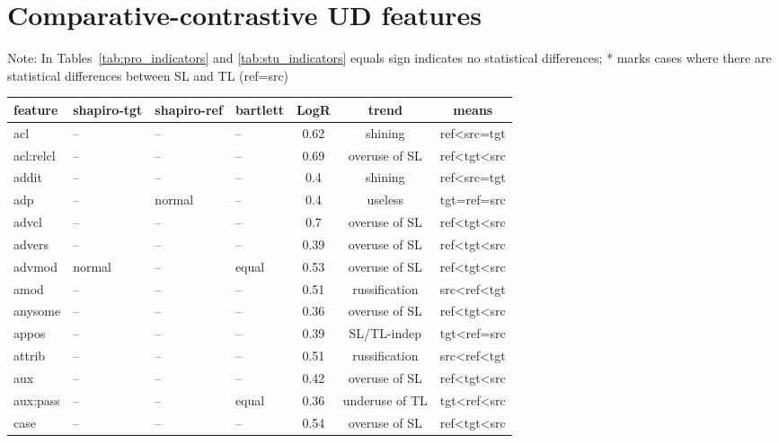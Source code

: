\chapter{\label{appx:feat_analysis}Comparative-contrastive UD features}

Note: In Tables~\ref{tab:pro_indicators} and \ref{tab:stu_indicators} equals sign indicates no statistical differences; * marks cases where there are statistical differences between SL and TL (ref=src)

\begin{longtable}{l|p{2cm}p{2cm}p{1.5cm}ccc}
	\toprule
	feature       & shapiro-tgt & shapiro-ref & bartlett & LogR & trend          & means \\
	\midrule
	acl           & -- & --   & --  & 0.62    & shining        & ref\textless{}src=tgt \\
	acl:relcl     & -- & --   & --  & 0.69    & overuse of SL & ref\textless{}tgt\textless{}src \\
	addit         & -- & --  & --   & 0.4     & shining   & ref\textless{}src=tgt \\
	adp           & -- & normal& --& 0.4  & useless   & tgt=ref=src   \\
	advcl         & -- & --   & --  & 0.7 & overuse of SL  & ref\textless{}tgt\textless{}src \\
	advers        & -- & --  & --   & 0.39 & overuse of SL  & ref\textless{}tgt\textless{}src \\
	advmod        & normal       & --  & equal& 0.53 & overuse of SL  & ref\textless{}tgt\textless{}src \\
	amod          & -- & --  & -- & 0.51    & russification  & src\textless{}ref\textless{}tgt \\
	anysome       & -- & --  & -- & 0.36    & overuse of SL  & ref\textless{}tgt\textless{}src \\
	appos         & -- & --  & -- & 0.39    & SL/TL-indep    & tgt\textless{}ref=src           \\
	attrib        & -- & --  & -- & 0.51    & russification  & src\textless{}ref\textless{}tgt \\
	aux           & -- & --  & -- & 0.42    & overuse of SL  & ref\textless{}tgt\textless{}src \\
	aux:pass      & -- & --  & equal & 0.36 & underuse of TL  & tgt\textless{}ref\textless{}src \\
	case          & -- & -- & -- & 0.54    & overuse of SL  & ref\textless{}tgt\textless{}src \\

\end{longtable}
